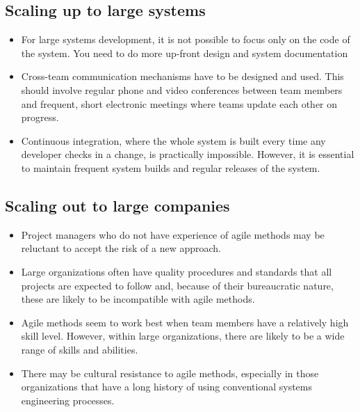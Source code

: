 \subsection{Scaling up to large systems}
\begin{itemize}

\item For large systems development, it is not possible to focus only on the code of the system. You need to do more up-front design and system documentation

\item Cross-team communication mechanisms have to be designed and used. This should involve regular phone and video conferences between team members and frequent, short electronic meetings where teams update each other on progress.

\item Continuous integration, where the whole system is built every time any developer checks in a change, is practically impossible. However, it is essential to maintain frequent system builds and regular releases of the system.

\end{itemize}
\subsection{ Scaling out to large companies}
\begin{itemize}
\item Project managers who do not have experience of agile methods may be reluctant to accept the risk of a new approach.

\item Large organizations often have quality procedures and standards that all projects are expected to follow and, because of their bureaucratic nature, these are likely to be incompatible with agile methods.

\item Agile methods seem to work best when team members have a relatively high skill level. However, within large organizations, there are likely to be a wide range of skills and abilities.

\item There may be cultural resistance to agile methods, especially in those organizations that have a long history of using conventional systems engineering processes.

\end{itemize}
